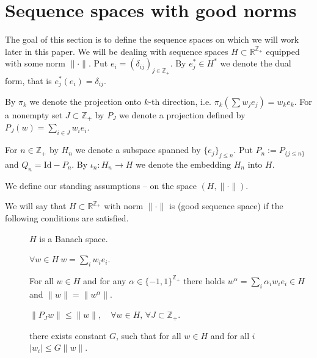 \section{Sequence spaces with good norms}
\label{sec:gss}

The goal of this section is to define the sequence spaces on which we will work later in this paper. We will be dealing with sequence spaces $H \subset \mathbb{R}^{\mathbb{Z}_+}$ equipped with some norm $\|\cdot\|$. Put $e_i=(\delta_{ij})_{j\in\mathbb Z_+}$. By $e_j^* \in H^*$ we denote the dual form, that is $e^*_j(e_i)=\delta_{ij}$.

By $\pi_k$ we denote the projection onto $k$-th direction, i.e. $\pi_k\left(\sum w_j e_j\right)=w_ke_k$. For a nonempty set $J \subset \mathbb{Z}_+$ by $P_J$ we denote a projection defined by $P_J(w)=\sum_{i\in J}w_i e_i$.


For $n \in \mathbb{Z}_+$  by $H_n$ we denote a subspace spanned by
$\{e_j\}_{j \leq n}$. Put $P_n:=P_{\{j \leq n\}}$ and $Q_n=\mathrm{Id}-P_n$. By $\iota_n:H_n \to H$ we denote the embedding $H_n$ into $H$.

We define our standing assumptions -- on the space $(H,\|\cdot\|)$.

\begin{definition}
We will say that $H \subset \mathbb{R}^{\mathbb{Z}_+}$ with norm $\| \cdot \|$ is \emph{\gss} (good sequence space) if the following conditions are satisfied.
\begin{description}
\item[] $H$ is a Banach space.
\item[] $\forall w \in H\ w=\sum_i w_i e_i$.
\item[] For all  $w \in H$ and for any $\alpha \in \{-1,1\}^{\mathbb{Z}_+}$ there holds $w^\alpha=\sum_i \alpha_i w_i e_i \in H$
and $\|w\|=\|w^\alpha\|$.
\item[] $\|P_J w\| \leq \|w\|,  \quad \forall w \in H, \, \forall J \subset \mathbb{Z}_+$.
\item[]  there exists  constant $G$, such that for all $w \in H$ and for all $i$ $|w_i| \leq G \|w\|$.
\end{description}
\end{definition}

